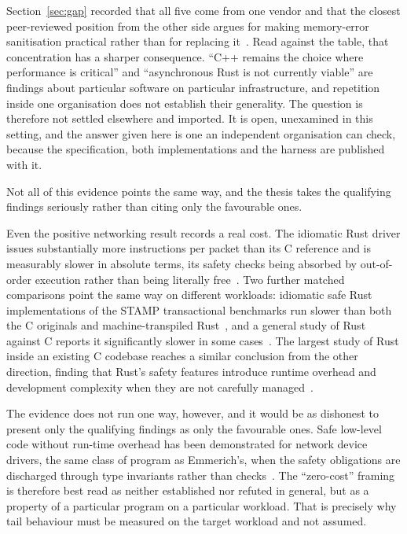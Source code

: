 \documentclass[english,twoside,openright,a4paper,censored,csm,software-track-2020]{HYthesisML}
\begin{document}
Section~\ref{sec:gap} recorded that all five come from one vendor and that the closest
peer-reviewed position from the other side argues for making memory-error sanitisation
practical rather than for replacing it~\cite{gjomemo2016mesc}. Read against the table, that
concentration has a sharper consequence. ``C++ remains the choice where performance is critical''
and ``asynchronous Rust is not currently viable'' are findings about particular software on
particular infrastructure, and repetition inside one organisation does not establish their
generality. The question is therefore not settled elsewhere and imported. It is open, unexamined
in this setting, and the answer given here is one an independent organisation can check, because
the specification, both implementations and the harness are published with it.

Not all of this evidence points the same way, and the thesis takes the qualifying findings
seriously rather than citing only the favourable ones.

Even the positive networking result records a real cost. The idiomatic Rust driver issues
substantially more instructions per packet than its C reference and is measurably slower in
absolute terms, its safety checks being absorbed by out-of-order execution rather than being
literally free~\cite{emmerich2019drivers}. Two further matched comparisons point the same way on
different workloads: idiomatic safe Rust implementations of the STAMP transactional benchmarks run
slower than both the C originals and machine-transpiled Rust~\cite{suchert2023stamp}, and a
general study of Rust against C reports it significantly slower in some
cases~\cite{okawa2024ruststudy}. The largest study of Rust inside an existing C codebase reaches a
similar conclusion from the other direction, finding that Rust's safety features introduce
runtime overhead and development complexity when they are not carefully
managed~\cite{li2026rustlinux}.

The evidence does not run one way, however, and it would be as dishonest to present only the
qualifying findings as only the favourable ones. Safe low-level code without run-time overhead has
been demonstrated for network device drivers, the same class of program as Emmerich's, when the
safety obligations are discharged through type invariants rather than checks~\cite{pirelli2023safelowlevel}.
The ``zero-cost'' framing~\cite{balasubramanian2017rust} is therefore best read as neither
established nor refuted in general, but as a property of a particular program on a particular
workload. That is precisely why tail behaviour must be measured on the target workload and not
assumed.
\end{document}

